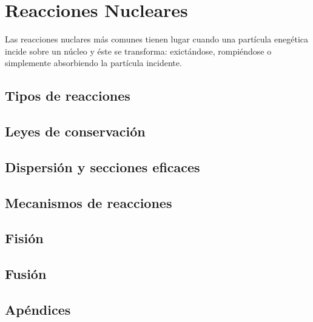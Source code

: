 \chapter{Reacciones Nucleares}

Las reacciones nuclares más comunes tienen lugar cuando una partícula enegética incide sobre un núcleo y éste se transforma: exictándose, rompiéndose o simplemente absorbiendo la partícula incidente.


\section{Tipos de reacciones}

\section{Leyes de conservación}

\section{Dispersión y secciones eficaces}

\section{Mecanismos de reacciones}

\section{Fisión}

\section{Fusión}

\section{Apéndices}